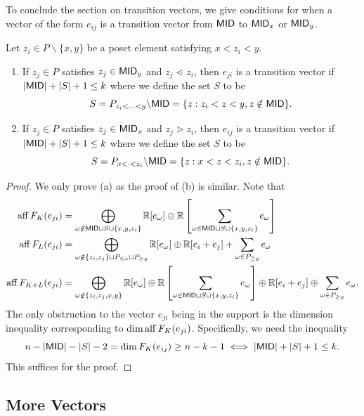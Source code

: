 \documentclass{puthesis-UG}
\begin{document}
To conclude the section on transition vectors, we give conditions for when a vector of the form $e_{ij}$ is a transition vector from $\mathsf{MID}$ to $\mathsf{MID}_x$ or $\mathsf{MID}_y$. 

\begin{prop} \label{prop-actually-important-transition-vector}
	Let $z_i \in P \backslash \{x, y\}$ be a poset element satisfying $x < z_i < y$. 
	\begin{enumerate}[label = (\alph*)]
		\item If $z_j \in P$ satisfies $z_j \in \mathsf{MID}_y$ and $z_j \lessdot z_i$, then $e_{ji}$ is a transition vector if $|\mathsf{MID}| + |S| + 1 \leq k$ where we define the set $S$ to be 
		\[
			S = P_{z_i < \ldots < y} \backslash \mathsf{MID} = \{z : z_i < z < y, z \notin \mathsf{MID}\}.
		\]
		\item If $z_j \in P$ satisfies $z_j \in \mathsf{MID}_x$ and $z_j \gtrdot z_i$, then $e_{ij}$ is a transition vector if $|\mathsf{MID}| + |S| + 1 \leq k$ where we define the set $S$ to be
		\[
			S = P_{x < \cdot < z_i} \backslash \mathsf{MID} = \{z : x < z < z_i, z \notin \mathsf{MID} \}.
		\]
	\end{enumerate}
\end{prop}

\begin{proof}
	We only prove (a) as the proof of (b) is similar. Note that 
	\begin{align*}
		\operatorname{aff} F_K(e_{ji}) & = \bigoplus_{\omega \notin \mathsf{MID} \sqcup S \sqcup \{x, y, z_i\}} \mathbb{R}[e_\omega] \oplus \mathbb{R} \left [ \sum_{\omega \in \mathsf{MID} \sqcup S \sqcup \{x, y, z_i\}} e_\omega \right ] \\
		\operatorname{aff} F_L(e_{ji}) & = \bigoplus_{\omega \notin \{z_i, z_j\} \sqcup P_{\leq x} \sqcup P_{\geq y}} \mathbb{R}[e_\omega] \oplus \mathbb{R}[e_i + e_j] + \sum_{\omega \in P_{\geq y}} e_\omega \\
		\operatorname{aff} F_{K+L}(e_{ji}) & = \bigoplus_{\omega \notin \{z_i, z_j, x, y\}} \mathbb{R}[e_\omega] \oplus \mathbb{R} \left [ \sum_{\omega \in \mathsf{MID} \sqcup S \sqcup \{x, y, z_i\}} e_\omega \right ] \oplus \mathbb{R}[e_i + e_j] \oplus \sum_{\omega \in P_{\geq y}} e_\omega.
	\end{align*}
	The only obstruction to the vector $e_{ji}$ being in the support is the dimension inequality corresponding to $\dim \operatorname{aff} F_K(e_{ji})$. Specifically, we need the inequality 
	\[
		n - |\mathsf{MID}| - |S| - 2 = \dim F_K(e_{ij}) \geq n - k - 1 \iff |\mathsf{MID}| + |S| + 1 \leq k.
	\]
	This suffices for the proof. 
\end{proof}


\subsection{More Vectors}
\end{document}
